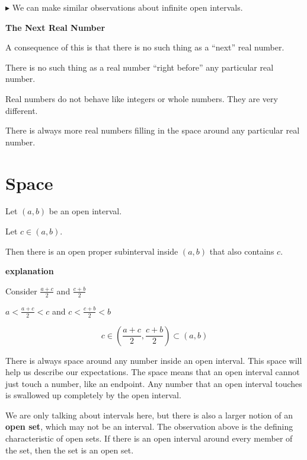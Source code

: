 \documentclass{ximera}
\begin{document}
$\blacktriangleright$ We can make similar observations about infinite open intervals. 






\begin{idea} \textbf{\textcolor{blue!55!black}{The Next Real Number}}


A consequence of this is that there is no such thing as a ``next'' real number. 


There is no such thing as a real number ``right before'' any particular real number.


\end{idea}

Real numbers do not behave like integers or whole numbers.  They are very different. 

There is always more real numbers filling in the space around any particular real number. 









\section*{Space}

\begin{observation} 


Let $(a,b)$ be an open interval.

Let $c \in (a,b)$.

Then there is an open proper subinterval inside $(a,b)$ that also contains $c$.

\textbf{\textcolor{red!75!green}{explanation}} 


Consider $\frac{a+c}{2}$ and  $\frac{c+b}{2}$ 

$a < \frac{a+c}{2} < c$ and  $c < \frac{c+b}{2}  < b$



\[   c \in \left(\frac{a+c}{2} , \frac{c+b}{2} \right) \subset (a,b)              \]


\end{observation}


There is always space around any number inside an open interval.  This space will help us describe our expectations.  The space means that an open interval cannot just touch a number, like an endpoint.  Any number that an open interval touches is swallowed up completely by the open interval.


We are only talking about intervals here, but there is also a larger notion of an \textbf{open set}, which may not be an interval.  The observation above is the defining characteristic of open sets.  If there is an open interval around every member of the set, then the set is an open set.
\end{document}
